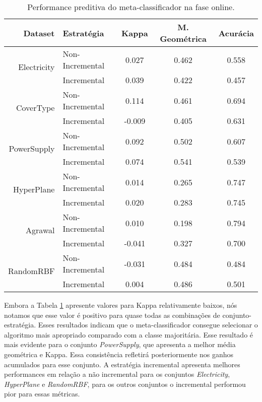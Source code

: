 \begin{table}[ht]
\caption{Performance preditiva do meta-classificador na fase online.}
\label{tab:onmetrics}
\centering
\begin{tabular}{r|l|c|c|c} \hline
Dataset     &  Estratégia    & Kappa & M. Geométrica & Acurácia \\ \hline
\multirow{2}{*}{Electricity} &  Non-Incremental      & 0.027 & 0.462  & 0.558    \\
            &  Incremental & 0.039 & 0.422  & 0.457    \\ \hline
\multirow{2}{*}{CoverType}   &  Non-Incremental       & 0.114 & 0.461  & 0.694    \\
            &  Incremental & -0.009 & 0.405  & 0.631    \\ \hline
\multirow{2}{*}{PowerSupply} &  Non-Incremental      & 0.092 & 0.502  & 0.607    \\
            &  Incremental & 0.074 & 0.541  & 0.539 \\ \hline
\multirow{2}{*}{HyperPlane}   &  Non-Incremental       & 0.014 & 0.265  & 0.747    \\
            &  Incremental & 0.020 & 0.283  & 0.745    \\ \hline
\multirow{2}{*}{Agrawal}   &  Non-Incremental       & 0.010 & 0.198  & 0.794    \\
            &  Incremental & -0.041 & 0.327  & 0.700    \\ \hline
\multirow{2}{*}{RandomRBF}   &  Non-Incremental       & -0.031 & 0.484  & 0.484    \\
            &  Incremental & 0.004 & 0.486  & 0.501
\end{tabular}
\end{table}

Embora a Tabela \ref{tab:onmetrics} apresente valores para Kappa relativamente baixos, nós notamos que esse valor é positivo para quase todas as combinações de conjunto-estratégia. Esses resultados indicam que o meta-classificador consegue selecionar o algoritmo mais apropriado comparado com a classe majoritária. Esse resultado é mais evidente para o conjunto \textit{PowerSupply}, que apresenta a melhor média geométrica e Kappa. Essa consistência refletirá posteriormente nos ganhos acumulados para esse conjunto. A estratégia incremental apresenta melhores performances em relação a não incremental para os conjuntos \textit{Electricity}, \textit{HyperPlane} e \textit{RandomRBF}, para os outros conjuntos o incremental performou pior para essas métricas.

